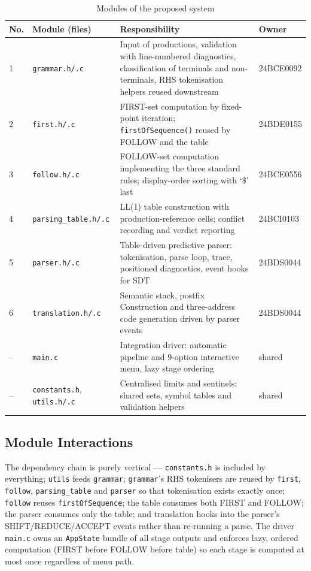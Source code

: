 \documentclass[12pt,a4paper,oneside,openany]{report}
\newcommand{\code}[1]{\texttt{#1}}
\begin{document}
\begin{table}[h]
  \caption{Modules of the proposed system}
  \label{tab:modules}
  \small
  \begin{tabularx}{\textwidth}{p{0.5cm}p{4.4cm}Xp{2.6cm}}
    \toprule
    \textbf{No.} & \textbf{Module (files)} & \textbf{Responsibility} &
    \textbf{Owner} \\
    \midrule
    1 & \code{grammar.h/.c} & Input of productions, validation with
    line-numbered diagnostics, classification of terminals and
    non-terminals, RHS tokenisation helpers reused downstream &
    24BCE0092 \\
    2 & \code{first.h/.c} & FIRST-set computation by fixed-point
    iteration; \code{firstOfSequence()} reused by FOLLOW and the table &
    24BDE0155 \\
    3 & \code{follow.h/.c} & FOLLOW-set computation implementing the three
    standard rules; display-order sorting with `$\$$' last & 24BCE0556 \\
    4 & \code{parsing\_table.h/.c} & LL(1) table construction with
    production-reference cells; conflict recording and verdict
    reporting & 24BCI0103 \\
    5 & \code{parser.h/.c} & Table-driven predictive parser: tokenisation,
    parse loop, trace, positioned diagnostics, event hooks for SDT &
    24BDS0044 \\
    6 & \code{translation.h/.c} & Semantic stack, postfix Construction and
    three-address code generation driven by parser events & 24BDS0044 \\
    -- & \code{main.c} & Integration driver: automatic pipeline and
    9-option interactive menu, lazy stage ordering & shared \\
    -- & \code{constants.h}, \code{utils.h/.c} & Centralised limits and
    sentinels; shared sets, symbol tables and validation helpers &
    shared \\
    \bottomrule
  \end{tabularx}
\end{table}

\subsection{Module Interactions}
The dependency chain is purely vertical --- \code{constants.h} is included
by everything; \code{utils} feeds \code{grammar}; \code{grammar}'s RHS
tokenisers are reused by \code{first}, \code{follow}, \code{parsing\_table}
and \code{parser} so that tokenisation exists exactly once; \code{follow}
reuses \code{firstOfSequence}; the table consumes both FIRST and FOLLOW;
the parser consumes only the table; and translation hooks into the
parser's SHIFT/REDUCE/ACCEPT events rather than re-running a parse. The
driver \code{main.c} owns an \code{AppState} bundle of all stage outputs
and enforces lazy, ordered computation (FIRST before FOLLOW before table)
so each stage is computed at most once regardless of menu path.
\end{document}
